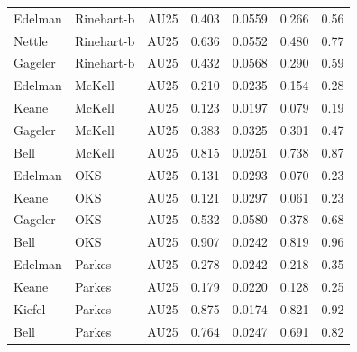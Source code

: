 \documentclass{monashthesis}
\begin{document}
\begin{center}
\begin{longtable}{lllllll}
Edelman & Rinehart-b & AU25 & 0.403 & 0.0559 & 0.266 & 0.56 \\
Nettle & Rinehart-b & AU25 & 0.636 & 0.0552 & 0.480 & 0.77 \\
Gageler & Rinehart-b & AU25 & 0.432 & 0.0568 & 0.290 & 0.59 \\
Edelman & McKell & AU25 & 0.210 & 0.0235 & 0.154 & 0.28 \\
Keane & McKell & AU25 & 0.123 & 0.0197 & 0.079 & 0.19 \\
Gageler & McKell & AU25 & 0.383 & 0.0325 & 0.301 & 0.47 \\
Bell & McKell & AU25 & 0.815 & 0.0251 & 0.738 & 0.87 \\
Edelman & OKS & AU25 & 0.131 & 0.0293 & 0.070 & 0.23 \\
Keane & OKS & AU25 & 0.121 & 0.0297 & 0.061 & 0.23 \\
Gageler & OKS & AU25 & 0.532 & 0.0580 & 0.378 & 0.68 \\
Bell & OKS & AU25 & 0.907 & 0.0242 & 0.819 & 0.96 \\
Edelman & Parkes & AU25 & 0.278 & 0.0242 & 0.218 & 0.35 \\
Keane & Parkes & AU25 & 0.179 & 0.0220 & 0.128 & 0.25 \\
Kiefel & Parkes & AU25 & 0.875 & 0.0174 & 0.821 & 0.92 \\
Bell & Parkes & AU25 & 0.764 & 0.0247 & 0.691 & 0.82 \\
\end{longtable}
\end{center}
\end{document}
